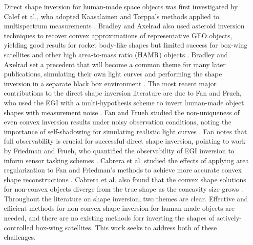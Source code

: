 Direct shape inversion for human-made space objects was first investigated by Calef et al., who adopted Kaasalainen and Torppa's methods applied to multispectrum measurements \cite{calef2006photometric}. Bradley and Axelrad also used asteroid inversion techniques to recover convex approximations of representative GEO objects, yielding good results for rocket body-like shapes but limited success for box-wing satellites and other high area-to-mass ratio (HAMR) objects \cite{bradley2014}. Bradley and Axelrad set a precedent that will become a common theme for many later publications, simulating their own light curves and performing the shape inversion in a separate black box environment \cite{bradley2014}. The most recent major contributions to the direct shape inversion literature are due to Fan and Frueh, who used the EGI with a multi-hypothesis scheme to invert human-made object shapes with measurement noise \cite{fan2019, fan2020thesis, fan2021}. Fan and Frueh studied the non-uniqueness of even convex inversion results under noisy observation conditions, noting the importance of self-shadowing for simulating realistic light curves \cite{fan2020thesis}. Fan notes that full observability is crucial for successful direct shape inversion, pointing to work by Friedman and Frueh, who quantified the observability of EGI inversion to inform sensor tasking schemes \cite{friedman2020, friedman2022}. Cabrera et al. studied the effects of applying area regularization to Fan and Friedman's methods to achieve more accurate convex shape reconstructions \cite{cabrera2021}. Cabrera et al. also found that the convex shape solutions for non-convex objects diverge from the true shape as the concavity size grows \cite{cabrera2021}. Throughout the literature on shape inversion, two themes are clear. Effective and efficient methods for non-convex shape inversion for human-made objects are needed, and there are no existing methods forr inverting the shapes of actively-controlled box-wing satellites. This work seeks to address both of these challenges.

